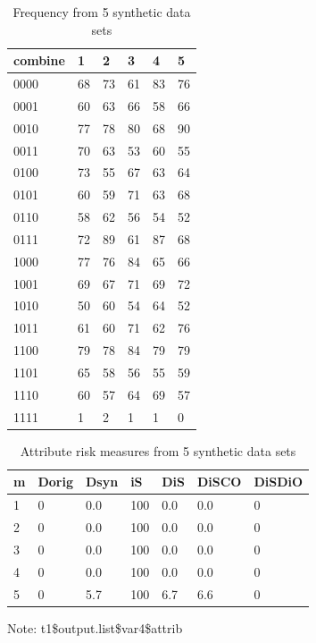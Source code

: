 \documentclass[runningheads]{llncs}
\begin{document}
\clearpage
\begin{table}[]
    \centering
    \caption{Frequency from 5 synthetic data sets}
    \begin{tabular}{llllll}
        \toprule
        combine & 1 & 2 & 3 & 4 & 5 \\ \midrule
        0000 & 68 & 73 & 61 & 83 & 76 \\
        0001 & 60 & 63 & 66 & 58 & 66 \\
        0010 & 77 & 78 & 80 & 68 & 90 \\
        0011 & 70 & 63 & 53 & 60 & 55 \\
        0100 & 73 & 55 & 67 & 63 & 64 \\
        0101 & 60 & 59 & 71 & 63 & 68 \\
        0110 & 58 & 62 & 56 & 54 & 52 \\
        0111 & 72 & 89 & 61 & 87 & 68 \\
        1000 & 77 & 76 & 84 & 65 & 66 \\
        1001 & 69 & 67 & 71 & 69 & 72 \\
        1010 & 50 & 60 & 54 & 64 & 52 \\
        1011 & 61 & 60 & 71 & 62 & 76 \\
        1100 & 79 & 78 & 84 & 79 & 79 \\
        1101 & 65 & 58 & 56 & 55 & 59 \\
        1110 & 60 & 57 & 64 & 69 & 57 \\
        1111 & 1  & 2  & 1  & 1  & 0  \\
        \bottomrule
    \end{tabular}
    \label{table:frequency_5_data_sets}
\end{table}


\begin{table}[]
    \centering
    \caption{Attribute risk measures from 5 synthetic data sets}
    \begin{tabular}{lllllll}
        \toprule
            m &   Dorig & Dsyn & iS & DiS & DiSCO & DiSDiO \\ \midrule
            1 &    0 &  0.0 & 100 & 0.0 &   0.0 &      0 \\
            2 &     0 &  0.0 & 100 & 0.0 &   0.0 &      0 \\
            3 &     0 &  0.0 & 100 & 0.0 &   0.0 &      0 \\
            4 &     0 &  0.0 & 100 & 0.0 &   0.0 &      0 \\ 
            5 &     0 &  5.7 & 100 & 6.7 &   6.6 &      0 \\ 
        \bottomrule
    \end{tabular}
    \label{table:attribute_disclosure_risk_5}
    \vspace{0.5em} %
    \noindent\parbox{0.8\textwidth}{\footnotesize Note: t1\$output.list\$var4\$attrib}
\end{table}
\end{document}
